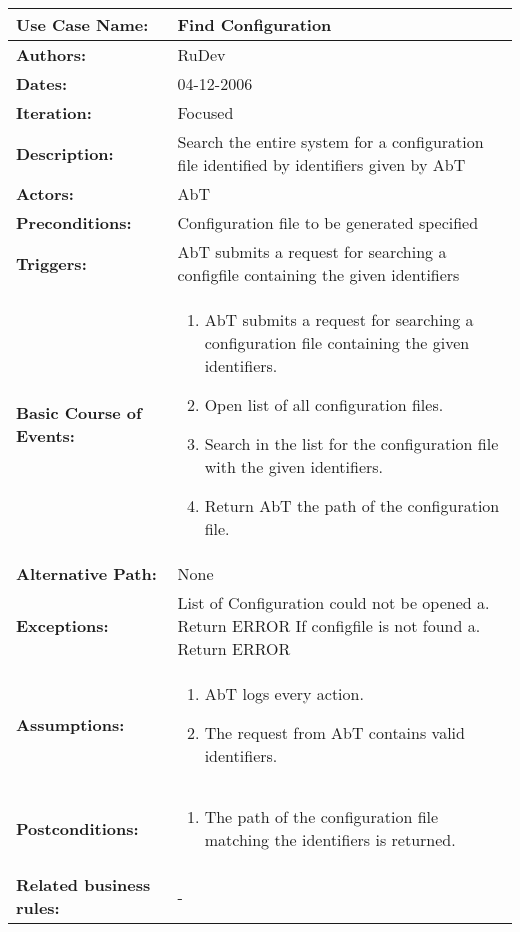 \begin{tabularx}{\linewidth}{|l|X|}
\hline
\textbf{Use Case Name:} & \textbf{Find Configuration} \\
\hline
\textbf{Authors:} & RuDev \\
\hline
\textbf{Dates:} & 04-12-2006 \\
\hline
\textbf{Iteration:} & Focused \\
\hline
\textbf{Description:} & Search the entire system for a configuration file identified by identifiers given by AbT \\
\hline
\textbf{Actors:} & AbT \\
\hline
\textbf{Preconditions:} & Configuration file to be generated specified \\
\hline
\textbf{Triggers:} & AbT submits a request for searching a configfile containing the given identifiers \\
\hline
\textbf{Basic Course of Events:} & 
\begin{minipage}{\linewidth} 
  \vspace{0.05em}
  \begin{enumerate}
   \item AbT submits a request for searching a configuration file containing the given identifiers.
   \item Open list of all configuration files.
   \item Search in the list for the configuration file with the given identifiers.
   \item Return AbT the path of the configuration file.
  \end{enumerate}
  \vspace{0.05em}
\end{minipage}
\\
\hline 
\textbf{Alternative Path:} & None \\
\hline
\textbf{Exceptions:} & List of Configuration could not be opened \newline a. Return ERROR \newline\newline If configfile is not found \newline a. Return ERROR \\
\hline
\textbf{Assumptions:} & \begin{enumerate}
							\item AbT logs every action.
							\item The request from AbT contains valid identifiers.
						\end{enumerate} \\
\hline
\textbf{Postconditions:} & 
  \begin{minipage}{\linewidth}
  \vspace{0.05em}
  \begin{enumerate}
    \item The path of the configuration file matching the identifiers is returned.
  \end{enumerate}
  \vspace{0.05em}
\end{minipage}
\\
\hline
\textbf{Related business rules:} & - \\
\hline
\end{tabularx}


